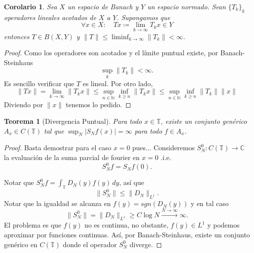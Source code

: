 \documentclass{article}
\newtheorem{Teorema}{Teorema}
\newtheorem{Corolario}{Corolario}
\theoremstyle{plain}
\theoremstyle{definition}
\newcommand{\T}{\mathbb{T}}
\newcommand{\C}{\mathbb{C}}
\newcommand{\N}{\mathbb{N}}
\newcommand{\abs}[1]{\lvert #1 \rvert}
\newcommand{\norm}[1]{\lVert #1 \rVert}
\begin{document}
\begin{Corolario}
  Sea \(X\) un espacio de Banach y \(Y\) un espacio normado. Sean \(\lbrace T_k \rbrace_{k}\)
  operadores lineales acotados de \(X\) a \(Y\). Supongamos que
  \begin{displaymath}
    \forall x\in X \colon\quad Tx \coloneqq \lim_{k\to\infty} T_k x \in Y
  \end{displaymath}
  entonces \(T\in B(X,Y)\) y \(\norm{T} \le \liminf_{k\to\infty} \norm{T_k} < \infty\).  
\end{Corolario}
\begin{proof}
  Como los operadores son acotados y el límite puntual existe, por Banach{-}Steinhaus 
  \begin{displaymath}
    \sup_{k} \norm{T_k} < \infty.
  \end{displaymath}
  Es sencillo verificar que \(T\) es lineal. 
  Por otro lado,
  \begin{displaymath}
    \norm{Tx}
    =
    \lim_{k\to\infty} \norm{T_k x}
    \le
    \sup_{n\in \N} \inf_{k\ge n} \norm{T_k x}
    \le
    \sup_{n\in \N} \inf_{k\ge n} \norm{T_k}\norm{x}
  \end{displaymath}
  Diviendo por \(\norm{x}\) tenemos lo pedido.  
\end{proof}

\begin{Teorema}[Divergencia Puntual]\label{teo:div-puntual}
  Para todo \(x\in\T\), existe un conjunto genérico \(A_x \in C(\T)\) tal que
  \(\sup_{N} \abs{S_N f(x)} = \infty\) para todo \(f\in A_x\).  
\end{Teorema}
\begin{proof}
  Basta demostrar para el caso \(x=0\) pues...
  Consideremos \(S_N^0 \colon C(\T) \to \C\) la evaluación de la suma parcial de fourier
  en \(x=0\) .i.e.
  \begin{displaymath}
    S_N^0 f = S_N f(0).
  \end{displaymath}
  
  Notar que \(S_N^0 f = \int_{\T} D_N(y) f(y) \, dy\), así que
  \begin{displaymath}
    \norm{S_N^0} \le \norm{D_N}_{L^1}.
  \end{displaymath}
  Notar que la igualdad se alcanza en \(f(y) = sgn(D_N(y))\) y en tal caso
  \begin{displaymath}
    \norm{S_N^0} = \norm{D_N}_{L^1} \ge C\log N \xrightarrow{N\to\infty} \infty.
  \end{displaymath}
  El problema es que \(f(y)\) no es continua, no obstante, \(f(y) \in L^1\) y podemos
  aproximar por funciones continuas. Así, por Banach-Steinhaus, existe un conjunto genérico
  en \(C(\T)\) donde el operador \(S_N^0\) diverge.  
\end{proof}
\end{document}
